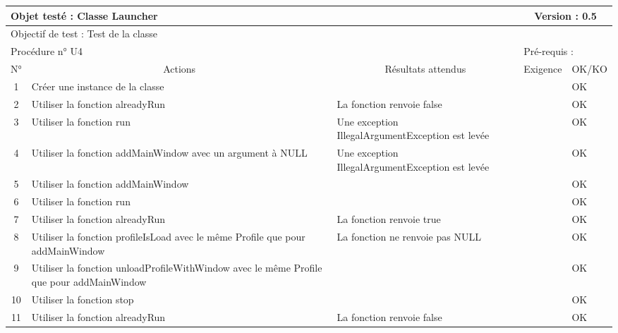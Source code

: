 \documentclass{../res/univ-projet}
\begin{document}
\begin{center}
	
    \begin{tabular}{|c|p{5cm}|p{5cm}|p{1.5cm}|p{1.5cm}|}
      \hline
      \multicolumn{3}{|l|}{Objet testé : Classe Launcher} & \multicolumn{2}{c|}{Version : 0.5}\\ \hline
      \multicolumn{5}{|l|}{Objectif de test : Test de la classe}\\ \hline
      \multicolumn{3}{|l|}{Procédure n° U4} & \multicolumn{2}{p{3cm}|}{Pré-requis : }\\ \hline
      \multicolumn{1}{|c|}{N°} & \multicolumn{1}{c|}{Actions} & \multicolumn{1}{c|}{Résultats attendus} & 
      \multicolumn{1}{c|}{Exigence} & \multicolumn{1}{c|}{OK/KO}\\ \hline
      1 & Créer une instance de la classe &  &  & OK \\
      2 & Utiliser la fonction alreadyRun & La fonction renvoie false &  & OK \\
      3 & Utiliser la fonction run & Une exception IllegalArgumentException est levée &  & OK \\
      4 & Utiliser la fonction addMainWindow avec un argument à NULL & Une exception IllegalArgumentException est levée &  & OK \\
      5 & Utiliser la fonction addMainWindow & &  & OK \\
	    6 & Utiliser la fonction run &  &  & OK \\
      7 & Utiliser la fonction alreadyRun & La fonction renvoie true &  & OK \\
      8 & Utiliser la fonction profileIsLoad avec le même Profile que pour addMainWindow & La fonction ne renvoie pas NULL &  & OK \\
      9 & Utiliser la fonction unloadProfileWithWindow avec le même Profile que pour addMainWindow &  &  & OK \\
      10 & Utiliser la fonction stop &  &  & OK \\
      11 & Utiliser la fonction alreadyRun & La fonction renvoie false &  & OK \\ 
	\hline
    \end{tabular}
    \vskip 2.2cm
	

\end{center}
\end{document}
